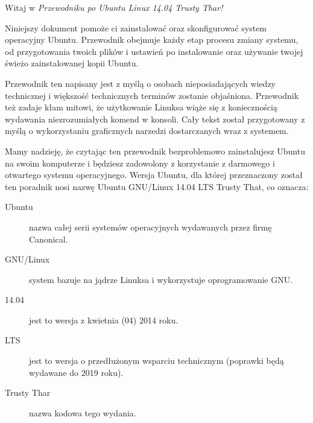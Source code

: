 \noindent Witaj w \emph{Przewodniku po Ubuntu Linux 14.04 Trusty Thar!}

Niniejszy dokument pomoże ci zainstalować oraz skonfigurować system operacyjny Ubuntu. Przewodnik obejmuje każdy etap procesu zmiany systemu, od przygotowania twoich plików i ustawień po instalowanie oraz używanie twojej świeżo zainstalowanej kopii Ubuntu.

Przewodnik ten napisany jest z myślą o osobach nieposiadających wiedzy technicznej i większość technicznych terminów zostanie objaśniona. Przewodnik też zadaje kłam mitowi, że użytkowanie Linuksa wiąże się z koniecznością wydawania niezrozumiałych komend w konsoli. Cały tekst został przygotowany z myślą o wykorzystaniu graficznych narzedzi dostarczanych wraz z systemem.

Mamy nadzieję, że czytając ten przewodnik bezproblemowo zainstalujesz Ubuntu na swoim komputerze i będziesz zadowolony z korzystanie z darmowego i otwartego systemu operacyjnego.
Wersja Ubuntu, dla której przeznaczony został ten poradnik nosi nazwę Ubuntu GNU/Linux 14.04 LTS Trusty That, co oznacza:
\begin{description}
\item[Ubuntu] nazwa całej serii systemów operacyjnych wydawanych przez firmę Canonical.
\item[GNU/Linux] system bazuje na jądrze Linuksa i wykorzystuje oprogramowanie GNU.
\item[14.04] jest to wersja z kwietnia (04) 2014 roku.
\item[LTS] jest to wersja o przedłużonym wsparciu technicznym (poprawki będą wydawane do 2019 roku).
\item[Trusty Thar] nazwa kodowa tego wydania.
\end{description}
\clearpage
